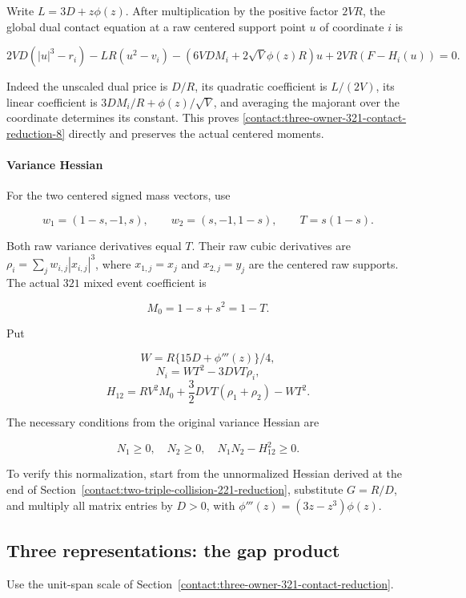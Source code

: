 Write $L=3D+z \phi(z)$. After multiplication by the positive factor $2VR$,
the global dual contact equation at a raw centered support point $u$ of
coordinate $i$ is

\[
 \boxed{
 2VD(|u|^3-r_i)-LR(u^2-v_i)
 -(6VDM_i+2\sqrt V\phi(z)R)u+2VR(F-H_i(u))=0.
 }
\tag{B.23.6}\label{contact:three-owner-321-contact-reduction-8}
\]

Indeed the unscaled dual price is $D/R$, its quadratic coefficient is
$L/(2V)$, its linear coefficient is $3DM_i/R+\phi(z)/\sqrt{V}$, and averaging
the majorant over the coordinate determines its constant. This proves \eqref{contact:three-owner-321-contact-reduction-8}
directly and preserves the actual centered moments.

\paragraph{Variance Hessian}

For the two centered signed mass vectors, use

\[
 w_1=(1-s,-1,s),\qquad w_2=(s,-1,1-s),\qquad T=s(1-s).
\]

Both raw variance derivatives equal $T$. Their raw cubic derivatives are
$\rho_i=\sum_j w_{i,j}|x_{i,j}|^3$, where
$x_{1,j}=x_j$ and $x_{2,j}=y_j$ are the centered raw supports.
The actual $321$ mixed event
coefficient is

\[
 M_0=1-s+s^2=1-T.
\]

Put

\[
 W=R\{15D+\phi'''(z)\}/4,
\]
\[
 N_i=WT^2-3DVT\rho_i,
\]
\[
 H_{12}=RV^2M_0+\frac32DVT(\rho_1+\rho_2)-WT^2.
\tag{B.23.7}\label{contact:three-owner-321-contact-reduction-12}
\]

The necessary conditions from the original variance Hessian are

\[
 \boxed{N_1\geq0,\quad N_2\geq0,\quad
 N_1N_2-H_{12}^2\geq0.}
\tag{B.23.8}\label{contact:three-owner-321-contact-reduction-13}
\]

To verify this normalization, start from the unnormalized Hessian
derived at the end of Section~\ref{contact:two-triple-collision-221-reduction},
substitute $G=R/D$, and multiply all matrix entries by $D>0$, with
$\phi'''(z)=(3z-z^3)\phi(z)$.

\subsection{Three representations: the gap product}\label{contact:three-owner-321-gap-collar}
Use the unit-span scale of Section~\ref{contact:three-owner-321-contact-reduction}.



